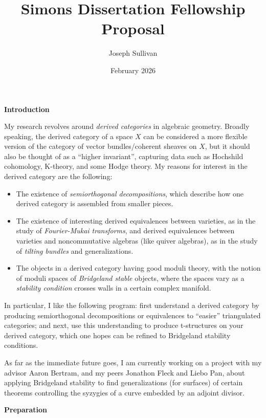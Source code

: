 \documentclass[12pt]{article}
\title{Simons Dissertation Fellowship Proposal}
\author{Joseph Sullivan}
\date{February 2026}
\begin{document}
\maketitle


\textbf{Introduction}

My research revolves around \textit{derived categories} in algebraic geometry. Broadly speaking, the derived category of a space $X$ can be considered a more flexible version of the category of vector bundles/coherent sheaves on $X$, but it should also be thought of as a ``higher invariant''\cite{Keller_2007}, capturing data such as Hochshild cohomology, K-theory, and some Hodge theory. My reasons for interest in the derived category are the following:
\begin{itemize}
    \item The existence of \textit{semiorthogonal decompositions}, which describe how one derived category is assembled from smaller pieces.
    \item The existence of interesting derived equivalences between varieties, as in the study of \textit{Fourier-Mukai transforms}, and derived equivalences between varieties and noncommutative algebras (like quiver algebras), as in the study of \textit{tilting bundles} and generalizations.
    \item The objects in a derived category having good moduli theory, with the notion of moduli spaces of \textit{Bridgeland stable} objects, where the spaces vary as a \textit{stability condition} crosses walls in a certain complex manifold.
\end{itemize}

In particular, I like the following program: first understand a derived category by producing semiorthogonal decompositions or equivalences to ``easier'' triangulated categories; and next, use this understanding to produce t-structures on your derived category, which one hopes can be refined to Bridgeland stability conditions.

As far as the immediate future goes, I am currently working on a project with my advisor Aaron Bertram, and my peers Jonathon Fleck and Liebo Pan, about applying Bridgeland stability to find generalizations (for surfaces) of certain theorems controlling the syzygies of a curve embedded by an adjoint divisor.

\textbf{Preparation}
\end{document}
